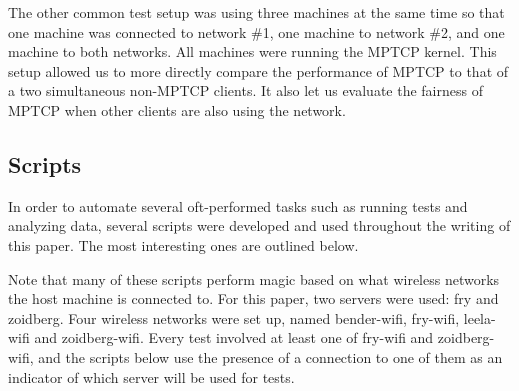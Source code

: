 \documentclass[12pt,a4paper]{article}
\begin{document}
The other common test setup was using three machines at the same time so that
one machine was connected to network \#1, one machine to network \#2, and one
machine to both networks. All machines were running the MPTCP kernel. This setup
allowed us to more directly compare the performance of MPTCP to that of a two
simultaneous non-MPTCP clients. It also let us evaluate the fairness of MPTCP
when other clients are also using the network.

\subsection{Scripts}
In order to automate several oft-performed tasks such as running tests and
analyzing data, several scripts were developed and used throughout the writing
of this paper. The most interesting ones are outlined below.

Note that many of these scripts perform magic based on what wireless networks
the host machine is connected to. For this paper, two servers were used: fry and
zoidberg. Four wireless networks were set up, named bender-wifi, fry-wifi,
leela-wifi and zoidberg-wifi. Every test involved at least one of fry-wifi and
zoidberg-wifi, and the scripts below use the presence of a connection to one of
them as an indicator of which server will be used for tests.
\end{document}
